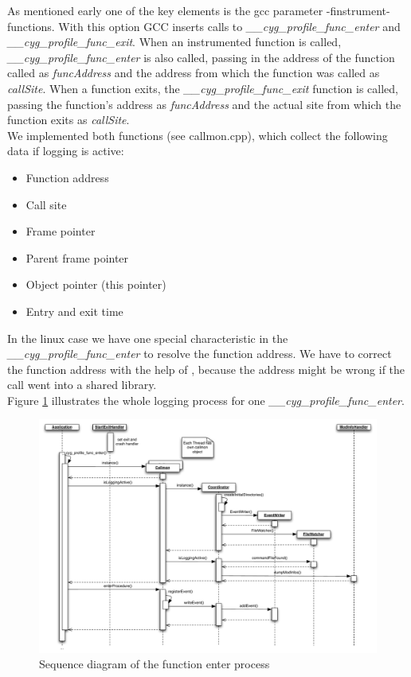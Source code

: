 As mentioned early one of the key elements is the gcc parameter -finstrument-functions. With this option GCC inserts calls to \emph{ \_\_cyg\_profile\_func\_enter} and \emph{\_\_cyg\_profile\_func\_exit}. When an instrumented function is called, \emph{ \_\_cyg\_profile\_func\_enter} is also called, passing in the address of the function called as \emph{funcAddress} and the address from which the function was called as \emph{callSite}. When a function exits, the \emph{\_\_cyg\_profile\_func\_exit} function is called, passing the function's address as \emph{funcAddress} and the actual site from which the function exits as \emph{callSite}.\\

We implemented both functions (see callmon.cpp), which collect the following data if logging is active:
\begin{itemize}
	\item Function address
	\item Call site
	\item Frame pointer
	\item Parent frame pointer
	\item Object pointer (this pointer)
	\item Entry and exit time
\end{itemize}

In the linux case we have one special characteristic in the \emph{ \_\_cyg\_profile\_func\_enter} to resolve the function address. We have to correct the function address with the help of , because the address might be wrong if the call went into a shared library.\\

Figure \ref{fig:unixfe_figure2} illustrates the whole logging process for one \emph{ \_\_cyg\_profile\_func\_enter}. 

\begin{figure}[ht]
\centering
\includegraphics[width=18cm]{images/callmon_sequence_diagram}
\caption{Sequence diagram of the function enter process}\label{fig:unixfe_figure2}
\end{figure}


